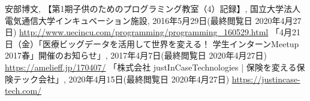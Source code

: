 {{\footnotesize
\begin{thebibliography}{99}
    \setcounter{enumiv}{13}
    \vspace*{-2mm}
    \setlength{\parskip}{0cm}
    \setlength{\itemsep}{0cm}
    \begin{spacing}{0.7}
         安部博文, 【第1期子供のためのプログラミング教室（4）記録】, 国立大学法人電気通信大学インキュベーション施設, 2016年5月29日(最終閲覧日 2020年4月27日) \url{http://www.uecincu.com/programming/programming_160529.html}
         「4月21日（金）「医療ビッグデータを活用して世界を変える！ 学生インターンMeetup 2017春」開催のお知らせ」, 2017年4月7日(最終閲覧日 2020年4月27日) \url{https://amelieff.jp/170407/}
         「株式会社 justInCaseTechnologies | 保険を変える保険テック会社」, 2020年4月15日(最終閲覧日 2020年4月27日) \url{https://justincase-tech.com/}
    \end{spacing}
\end{thebibliography}
}
}

